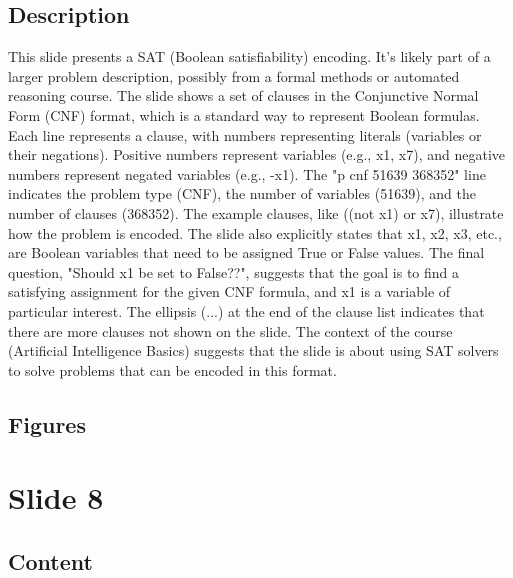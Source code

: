 \documentclass{article}%
\begin{document}
\subsection{Description}%
This slide presents a SAT (Boolean satisfiability) encoding.  It's likely part of a larger problem description, possibly from a formal methods or automated reasoning course.  The slide shows a set of clauses in the Conjunctive Normal Form (CNF) format, which is a standard way to represent Boolean formulas.  Each line represents a clause, with numbers representing literals (variables or their negations).  Positive numbers represent variables (e.g., x1, x7), and negative numbers represent negated variables (e.g., -x1).  The "p cnf 51639 368352" line indicates the problem type (CNF), the number of variables (51639), and the number of clauses (368352).  The example clauses, like ((not x1) or x7), illustrate how the problem is encoded.  The slide also explicitly states that x1, x2, x3, etc., are Boolean variables that need to be assigned True or False values.  The final question, "Should x1 be set to False??", suggests that the goal is to find a satisfying assignment for the given CNF formula, and x1 is a variable of particular interest.  The ellipsis (...) at the end of the clause list indicates that there are more clauses not shown on the slide. The context of the course (Artificial Intelligence Basics) suggests that the slide is about using SAT solvers to solve problems that can be encoded in this format.%
\subsection{Figures}%
\begin{figure}[H]%
\centering%
\end{figure}

%
\newpage%
\section{Slide 8}%
\label{sec:Slide8}%
\subsection{Content}%
%
\end{document}
